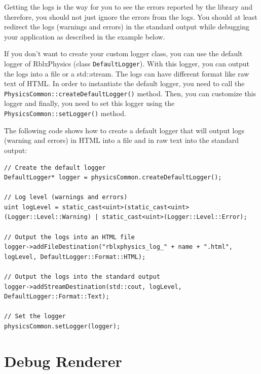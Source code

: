 \documentclass[a4paper,12pt]{article}
\begin{document}
    Getting the logs is the way for you to see the errors reported by the library and therefore, you should not just ignore the errors from the logs.
    You should at least redirect the logs (warnings and errors) in the standard output while debugging your application as described in the example
    below. \\

    \begin{sloppypar}
    If you don't want to create your custom logger class, you can use the default logger of RblxPhysics (class \texttt{DefaultLogger}). With this
    logger, you can output the logs into
    a file or a std::stream. The logs can have different format like raw text of HTML. In order to instantiate the default logger, you need to call the
    \texttt{PhysicsCommon::createDefaultLogger()} method. Then, you can customize this logger and finally, you need to set this logger using the
    \texttt{PhysicsCommon::setLogger()} method. \\
    \end{sloppypar}

    The following code shows how to create a default logger that will output logs (warning and errors) in HTML into a file and in raw text into
    the standard output: \\

    \begin{lstlisting}
// Create the default logger
DefaultLogger* logger = physicsCommon.createDefaultLogger();

// Log level (warnings and errors)
uint logLevel = static_cast<uint>(static_cast<uint>(Logger::Level::Warning) | static_cast<uint>(Logger::Level::Error);

// Output the logs into an HTML file
logger->addFileDestination("rblxphysics_log_" + name + ".html", logLevel, DefaultLogger::Format::HTML);

// Output the logs into the standard output
logger->addStreamDestination(std::cout, logLevel, DefaultLogger::Format::Text);

// Set the logger
physicsCommon.setLogger(logger);
    \end{lstlisting}

   \section{Debug Renderer}
  
\end{document}

